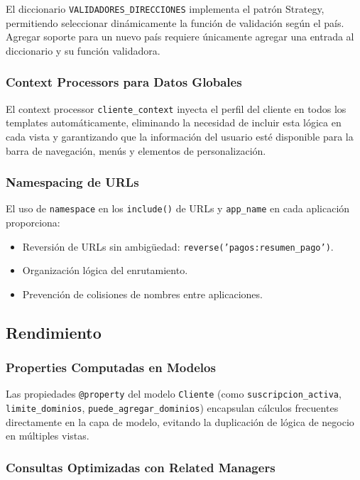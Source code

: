 \documentclass[12pt, a4paper]{article}
\begin{document}
{El diccionario \texttt{VALIDADORES\_DIRECCIONES} implementa el patrón Strategy, permitiendo seleccionar dinámicamente la función de validación según el país. Agregar soporte para un nuevo país requiere únicamente agregar una entrada al diccionario y su función validadora.

\subsubsection{Context Processors para Datos Globales}

El context processor \texttt{cliente\_context} inyecta el perfil del cliente en todos los templates automáticamente, eliminando la necesidad de incluir esta lógica en cada vista y garantizando que la información del usuario esté disponible para la barra de navegación, menús y elementos de personalización.

\subsubsection{Namespacing de URLs}

El uso de \texttt{namespace} en los \texttt{include()} de URLs y \texttt{app\_name} en cada aplicación proporciona:
\begin{itemize}
    \item Reversión de URLs sin ambigüedad: \texttt{reverse('pagos:resumen\_pago')}.
    \item Organización lógica del enrutamiento.
    \item Prevención de colisiones de nombres entre aplicaciones.
\end{itemize}

\subsection{Rendimiento}

\subsubsection{Properties Computadas en Modelos}

Las propiedades \texttt{@property} del modelo \texttt{Cliente} (como \texttt{suscripcion\_activa}, \texttt{limite\_dominios}, \texttt{puede\_agregar\_dominios}) encapsulan cálculos frecuentes directamente en la capa de modelo, evitando la duplicación de lógica de negocio en múltiples vistas.

\subsubsection{Consultas Optimizadas con Related Managers}

}
\end{document}
